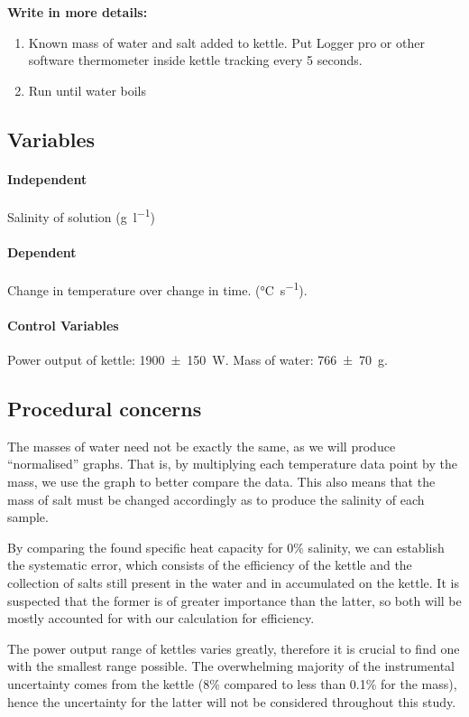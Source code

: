 \textbf{Write in more details:}
\begin{enumerate}
	\item Known mass of water and salt added to kettle. Put Logger pro or other software thermometer inside kettle tracking every 5 seconds.
	\item Run until water boils
\end{enumerate}

\subsection{Variables}
\paragraph{Independent} Salinity of solution (\si{\gram\per\litre})
\paragraph{Dependent} Change in temperature over change in time. (\si{\celsius\per\second}).
\paragraph{Control Variables} Power output of kettle: \SI{1900 \pm 150}{\watt}. Mass of water: \SI{766\pm70}{\gram}. 


\subsection{Procedural concerns}
The masses of water need not be exactly the same, as we will produce ``normalised'' graphs. That is, by multiplying each temperature data point by the mass, we use the graph to better compare the data. This also means that the mass of salt must be changed accordingly as to produce the salinity of each sample.

By comparing the found specific heat capacity for 0\% salinity, we can establish the systematic error, which consists of the efficiency of the kettle and the collection of salts still present in the water and in accumulated on the kettle. It is suspected that the former is of greater importance than the latter, so both will be mostly accounted for with our calculation for efficiency.

The power output range of kettles varies greatly, therefore it is crucial to find one with the smallest range possible. The overwhelming majority of the instrumental uncertainty comes from the kettle (8\% compared to less than 0.1\% for the mass), hence the uncertainty for the latter will not be considered throughout this study.

